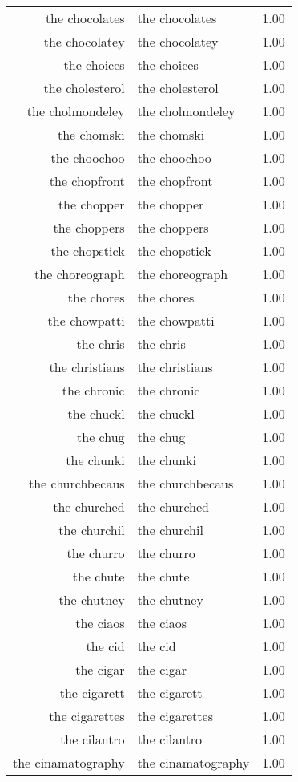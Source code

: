\begin{table}[ht]
\begin{tabular}{rlr}
  the chocolates & the chocolates & 1.00 \\ 
  the chocolatey & the chocolatey & 1.00 \\ 
  the choices & the choices & 1.00 \\ 
  the cholesterol & the cholesterol & 1.00 \\ 
  the cholmondeley & the cholmondeley & 1.00 \\ 
  the chomski & the chomski & 1.00 \\ 
  the choochoo & the choochoo & 1.00 \\ 
  the chopfront & the chopfront & 1.00 \\ 
  the chopper & the chopper & 1.00 \\ 
  the choppers & the choppers & 1.00 \\ 
  the chopstick & the chopstick & 1.00 \\ 
  the choreograph & the choreograph & 1.00 \\ 
  the chores & the chores & 1.00 \\ 
  the chowpatti & the chowpatti & 1.00 \\ 
  the chris & the chris & 1.00 \\ 
  the christians & the christians & 1.00 \\ 
  the chronic & the chronic & 1.00 \\ 
  the chuckl & the chuckl & 1.00 \\ 
  the chug & the chug & 1.00 \\ 
  the chunki & the chunki & 1.00 \\ 
  the churchbecaus & the churchbecaus & 1.00 \\ 
  the churched & the churched & 1.00 \\ 
  the churchil & the churchil & 1.00 \\ 
  the churro & the churro & 1.00 \\ 
  the chute & the chute & 1.00 \\ 
  the chutney & the chutney & 1.00 \\ 
  the ciaos & the ciaos & 1.00 \\ 
  the cid & the cid & 1.00 \\ 
  the cigar & the cigar & 1.00 \\ 
  the cigarett & the cigarett & 1.00 \\ 
  the cigarettes & the cigarettes & 1.00 \\ 
  the cilantro & the cilantro & 1.00 \\ 
  the cinamatography & the cinamatography & 1.00 \\ 

\end{tabular}
\end{table}
